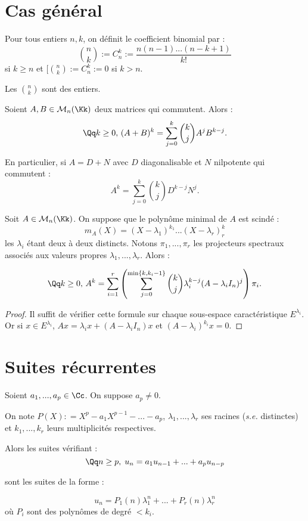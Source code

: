 \documentclass[class=report,crop=false]{standalone}
\begin{document}
\section{Cas général}

\begin{definition}
Pour tous entiers $n,k$, on définit le coefficient binomial par :
\[{n \choose k} := C_n^k := \frac{n(n-1) ...(n-k+1)}{k!}\]
si $k \ge n$ et $ [{n \choose k} := C_n^k:=0$ si $k >n$.

Les $n \choose k$ sont des entiers.
\end{definition}

\begin{proposition}
Soient $A,B \in\mathcal{M}_n(\Kk)$ deux matrices qui commutent. Alors :
\[\Qq k \ge 0,\, (A+B)^k = \sum_{j=0}^k {k \choose j} A^jB^{k-j} .\]
\end{proposition}


En particulier, si $A =D+N$ avec $D$ diagonalisable et $N$ nilpotente qui commutent :
\[A^k = \sum_{j=0}^k{ k \choose j} D^{k-j}N^{j} .\]

\begin{proposition}\label{pro:formulpuis}
Soit $A\in \mathcal{M}_n(\Kk)$. On suppose que le polynôme minimal de $A$ est scindé :
\[m_A(X) = (X-\lambda_1)^{k_1}... (X-\lambda_r)^k_r\]
les $\lambda_i$ étant deux à deux distincts. Notons $\pi_1,...,\pi_r$ les projecteurs spectraux associés aux valeurs propres $\lambda_1,...,\lambda_r$. Alors :

\[\Qq k \ge 0,\, A^k = \sum_{i = 1}^r \left( \sum_{j=0}^{\min \{k,k_i-1\}} {k \choose j} \lambda_i^{k-j}(A-\lambda_iI_n)^j\right) \pi_i .\]
\end{proposition}

\begin{proof}
Il suffit de vérifier cette formule sur chaque sous-espace caractéristique $E^{\lambda_i}$. Or si $x \in E^{\lambda_i}$, $Ax = \lambda_i x + (A-\lambda_iI_n)x$ et $(A-\lambda_i)^{k_i}x = 0$.
\end{proof}


\section{Suites récurrentes}

\begin{theoreme}
Soient $a_1,...,a_p \in \Cc$. On suppose $a_p \not=0$.

On note $P(X) : = X^p -a_1X^{p-1} - ... - a_p$, $\lambda_1,...,\lambda_r$ ses racines ({\it s.e. } distinctes) et $k_1,...,k_r$ leurs multiplicités respectives.

Alors les suites vérifiant :
$$\Qq n \ge p ,\; u_n= a_1 u_{n-1} +...+ a_pu_{n-p}$$

sont les suites de la forme :

$$u_n = P_1(n) \lambda_1^n +... + P_r(n)\lambda_r^n$$
où $P_i$ sont des polynômes de degré $< k_i$.
\end{theoreme}
\end{document}

